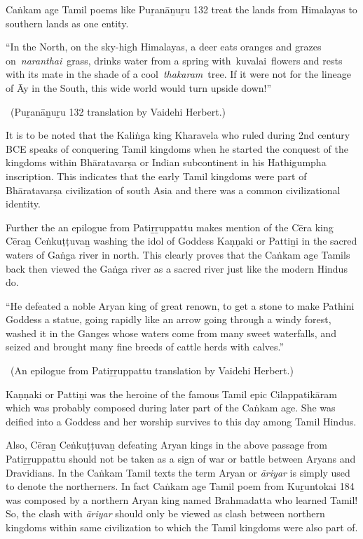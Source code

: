 Caṅkam age Tamil poems like Puṟanāṉuṟu 132 treat the lands from Himalayas to southern lands as one entity.

\begin{myquote}
“In the North, on the sky-high Himalayas, a deer eats oranges and grazes on \textit{naranthai} grass, drinks water from a spring with kuvalai flowers and rests with its mate in the shade of a cool \textit{thakaram} tree. If it were not for the lineage of Āy in the South, this wide world would turn upside down!”

~\hfill (Puṟanāṉuṟu 132 translation by Vaidehi Herbert.)
\end{myquote}

It is to be noted that the Kaliṅga king Kharavela who ruled during 2nd century BCE speaks of conquering Tamil kingdoms when he started the conquest of the kingdoms within Bhāratavarṣa or Indian subcontinent in his Hathigumpha inscription. This indicates that the early Tamil kingdoms were part of Bhāratavarṣa civilization of south Asia and there was a common civilizational identity.

Further the an epilogue from Patiṟṟuppattu makes mention of the Cēra king Cēraṉ Ceṅkuṭṭuvaṉ washing the idol of Goddess Kaṇṇaki or Pattiṉi in the sacred waters of Gaṅga river in north. This clearly proves that the Caṅkam age Tamils back then viewed the Gaṅga river as a sacred river just like the modern Hindus do.

\begin{myquote}
“He defeated a noble Aryan king of great renown, to get a stone to make Pathini Goddess a statue, going rapidly like an arrow going through a windy forest, washed it in the Ganges whose waters come from many sweet waterfalls, and seized and brought many fine breeds of cattle herds with calves.”

~\hfill (An epilogue from Patiṟṟuppattu translation by Vaidehi Herbert.)
\end{myquote}

Kaṇṇaki or Pattiṉi was the heroine of the famous Tamil epic Cilappatikāram which was probably composed during later part of the Caṅkam age. She was deified into a Goddess and her worship survives to this day among Tamil Hindus.

Also, Cēraṉ Ceṅkuṭṭuvaṉ defeating Aryan kings in the above passage from Patiṟṟuppattu should not be taken as a sign of war or battle between Aryans and Dravidians. In the Caṅkam Tamil texts the term Aryan or \textit{āriyar} is simply used to denote the northerners. In fact Caṅkam age Tamil poem from Kuṟuntokai 184 was composed by a northern Aryan king named Brahmadatta who learned Tamil! So, the clash with \textit{āriyar} should only be viewed as clash between northern kingdoms within same civilization to which the Tamil kingdoms were also part of.

